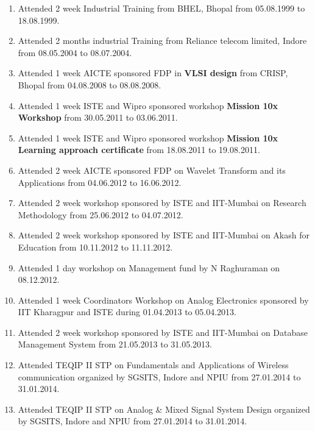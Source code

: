 \begin{enumerate}
	
	\item Attended 2 week Industrial Training from BHEL, Bhopal from 05.08.1999 to 18.08.1999.
	
	\item Attended 2 months industrial Training from Reliance telecom limited, Indore from 08.05.2004 to 08.07.2004.
	
	\item Attended 1 week AICTE sponsored FDP in \textbf{VLSI design} from CRISP, Bhopal from 04.08.2008 to 08.08.2008.
	
	\item Attended 1 week ISTE and Wipro sponsored workshop \textbf{Mission 10x Workshop} from 30.05.2011 to 03.06.2011.
	
	\item Attended 1 week ISTE and Wipro sponsored workshop \textbf{Mission 10x Learning approach certificate} from 18.08.2011 to 19.08.2011.
	
	\item Attended 2 week AICTE sponsored FDP on Wavelet Transform and its Applications from 04.06.2012 to 16.06.2012.
	
	\item Attended 2 week workshop sponsored by ISTE and IIT-Mumbai on Research Methodology from 25.06.2012 to 04.07.2012.
	
	\item Attended 2 week workshop sponsored by ISTE and IIT-Mumbai on Akash for Education from 10.11.2012 to 11.11.2012.
	
	\item Attended 1 day workshop on Management fund by N Raghuraman on 08.12.2012.
	
	\item Attended 1 week  Coordinators Workshop on Analog Electronics sponsored by IIT Kharagpur and ISTE during 01.04.2013 to 05.04.2013.
	
	\item Attended 2 week workshop sponsored by ISTE and IIT-Mumbai on Database Management System from 21.05.2013 to 31.05.2013.
	
	\item Attended TEQIP II STP on Fundamentals and Applications of Wireless communication organized by SGSITS, Indore and NPIU from 27.01.2014 to 31.01.2014.
	
	\item Attended TEQIP II STP on Analog \& Mixed Signal System Design organized by SGSITS, Indore and NPIU from 27.01.2014 to 31.01.2014.
\end{enumerate}

	

